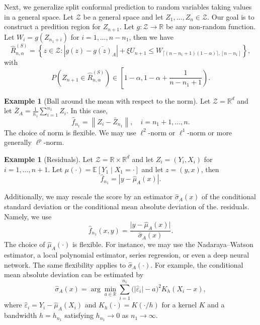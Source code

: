 \documentclass[a4paper,12pt]{article}
\numberwithin{equation}{section}
\theoremstyle{plain}
\theoremstyle{definition}
\newtheorem{example}[theorem]{Example}
\theoremstyle{remark}
\begin{document}
Next, we generalize split conformal prediction to random variables taking values in a general space. Let $\mathcal{Z}$ be a general space and let $Z_1,\dots,Z_n\in\mathcal{Z}$. Our goal is to construct a predition region for $Z_{n+1}$. Let $g:\mathcal{Z}\to\mathbb{R}$ be any non-random function. Let $W_i=g(Z_{n_1+i})$ for $i=1,\dots,n-n_1$, then we have
\begin{equation}
    \hat{R}_{n,\alpha}^{(S)}=\left\{z\in\mathcal{Z}:\left|g(z)-\overline{g(z)}_A\right|+\xi U_{n+1}\leq W_{\lceil(n-n_1+1)(1-\alpha)\rceil,[n-n_1]}\right\},
\end{equation}
with
\begin{equation}
    P\left(Z_{n+1}\in\hat{R}_{n,\alpha}^{(S)}\right)\in\left[1-\alpha,1-\alpha+\frac{1}{n-n_1+1}\right).
\end{equation}

\begin{example}[Ball around the mean with respect to the norm]
    Let $\mathcal{Z}=\mathbb{R}^d$ and let $\bar{Z}_A=\frac{1}{n_1}\sum_{i=1}^{n_1}Z_i$. In this case, 
    \[
    \hat{f}_{n_1} = \left\|Z_i-\bar{Z}_{n_1}\right\|,\quad i=n_1+1,\dots,n.
    \]
    The choice of norm is flexible. We may use $\ell^2$-norm or $\ell^1$-norm or more generally $\ell^p$-norm.
\end{example}

\begin{example}[Residuals]
    Let $\mathcal{Z}=\mathbb{R}\times \mathbb{R}^d$ and let $Z_i=(Y_i,X_i)$ for $i=1,\dots,n+1$. Let $\mu(\cdot)=\mathbb{E}[Y_1\mid X_1=\cdot]$ and let $z=(y,x)$, then 
    \[
    \hat{f}_{n_1}=\left|y-\hat{\mu}_A(x)\right|.
    \]
\end{example}

Additionally, we may rescale the score by an estimator $\hat{\sigma}_A(x)$ of the conditional standard deviation or the conditional mean absolute deviation of the. residuals. Namely, we use
\begin{equation*}
  \hat{f}_{n_1}(x,y)=\frac{\lvert y-\hat{\mu}_A(x)\rvert}{\hat{\sigma}_A(x)}.
\end{equation*}
The choice of $\hat{\mu}_A(\cdot)$ is flexible. For instance, we may use the Nadaraya--Watson estimator, a local polynomial estimator, series regression, or even
a deep neural network. The same flexibility applies to $\hat{\sigma}_A(\cdot)$. For example, the conditional mean absolute deviation can be estimated by
\begin{equation}
  \hat{\sigma}_A(x)=\arg\min_{a\in\mathbb{R}}\sum_{i=1}^{n_1}
  \bigl(\lvert\hat{\varepsilon}_i\rvert-a\bigr)^2K_h(X_i-x),
\end{equation}
where $\hat{\varepsilon}_i=Y_i-\hat{\mu}_A(X_i)$ and $K_h(\cdot)=K(\cdot/h)$ for a kernel $K$ and a bandwidth $h=h_{n_1}$ satisfying $h_{n_1}\to 0$ as $n_1\to\infty$.
\end{document}
